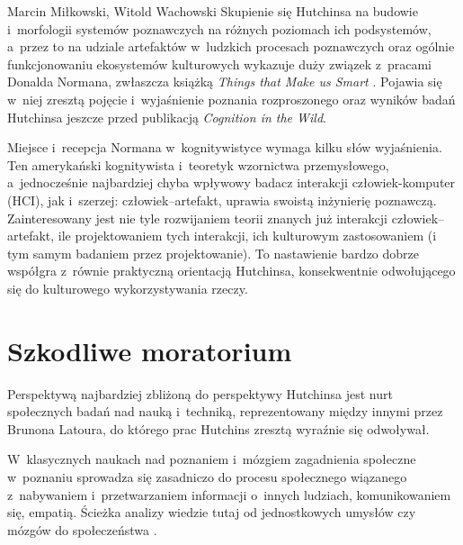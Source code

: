 \begin{artplenv2auth}{Marcin Miłkowski, Witold Wachowski}
Skupienie się Hutchinsa na budowie i~morfologii systemów poznawczych na różnych poziomach ich podsystemów, a~przez to na udziale artefaktów w~ludzkich procesach poznawczych oraz ogólnie funkcjonowaniu ekosystemów kulturowych wykazuje duży związek z~pracami Donalda Normana, zwłaszcza książką \textit{Things that Make us Smart}
\parencite*[][]{salomon_distributed_1993}. %
 Pojawia się w~niej zresztą pojęcie i~wyjaśnienie poznania rozproszonego oraz wyników badań Hutchinsa jeszcze przed publikacją \textit{Cognition in the Wild}.

Miejsce i~recepcja Normana w~kognitywistyce wymaga kilku słów wyjaśnienia. Ten amerykański kognitywista i~teoretyk wzornictwa przemysłowego, a~jednocześnie najbardziej chyba wpływowy badacz interakcji człowiek-komputer (HCI), jak i~szerzej: człowiek–artefakt, uprawia swoistą inżynierię poznawczą. Zainteresowany jest nie tyle rozwijaniem teorii znanych już interakcji człowiek–artefakt, ile projektowaniem tych interakcji, ich kulturowym zastosowaniem (i tym samym badaniem przez projektowanie). To nastawienie bardzo dobrze współgra z~równie praktyczną orientacją Hutchinsa, konsekwentnie odwołującego się do kulturowego wykorzystywania rzeczy.

\section{Szkodliwe moratorium}

Perspektywą najbardziej zbliżoną do perspektywy Hutchinsa jest nurt społecznych badań nad nauką i~techniką, reprezentowany między innymi przez Brunona Latoura, do którego prac Hutchins zresztą wyraźnie się odwoływał.

W~klasycznych naukach nad poznaniem i~mózgiem zagadnienia społeczne w~poznaniu sprowadza się zasadniczo do procesu społecznego wiązanego z~nabywaniem i~przetwarzaniem informacji o~innych ludziach, komunikowaniem się, empatią. Ścieżka analizy wiedzie tutaj od jednostkowych umysłów czy mózgów do społeczeństwa
\parencite[zob. np.][]{fiske_social_2008}.%



\end{artplenv2auth}
